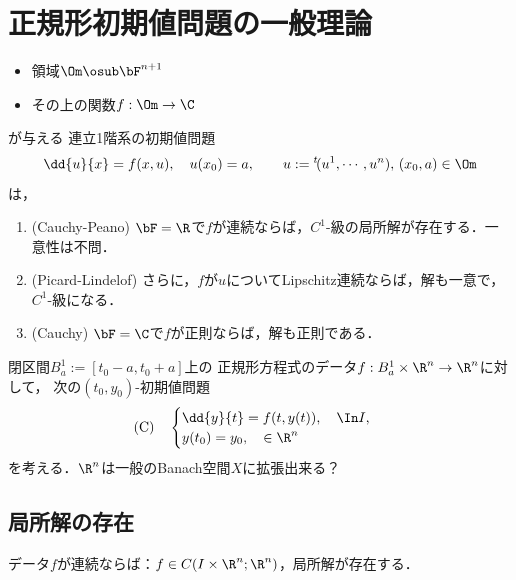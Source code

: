 \documentclass[uplatex,dvipdfmx]{jsreport}
\begin{document}
\section{正規形初期値問題の一般理論}

\begin{tcolorbox}[colframe=ForestGreen, colback=ForestGreen!10!white,breakable,colbacktitle=ForestGreen!40!white,coltitle=black,fonttitle=\bfseries\sffamily,
title=]
    \begin{remarks}\mbox{}
        \begin{itemize}
            \item 領域$\Om\osub\bF^{n+1}$
            \item その上の関数$f:\Om\to\C$
        \end{itemize}
        が与える
        連立1階系の初期値問題
        \[\dd{u}{x}=f(x,u),\quad u(x_0)=a,\qquad u:={}^t\!(u^1,\cdots,u^n),\,(x_0,a)\in\Om\]
        は，
        \begin{enumerate}
            \item (Cauchy-Peano) $\bF=\R$で$f$が連続ならば，$C^1$-級の局所解が存在する．一意性は不問．
            \item (Picard-Lindelof) さらに，$f$が$u$についてLipschitz連続ならば，解も一意で，$C^1$-級になる．
            \item (Cauchy) $\bF=\C$で$f$が正則ならば，解も正則である．
        \end{enumerate}
    \end{remarks}
\end{tcolorbox}

\begin{problem}
    閉区間$B^1_a:=[t_0-a,t_0+a]$上の
    正規形方程式のデータ$f:B^1_a\times\R^n\to\R^n$に対して，
    次の$(t_0,y_0)$-初期値問題
    \[\mathrm{(C)}\quad\begin{cases}
        \dd{y}{t}=f(t,y(t)),\quad\In I,\\
        y(t_0)=y_0,\quad\in\R^n
    \end{cases}\]
    を考える．$\R^n$は一般のBanach空間$X$に拡張出来る？
\end{problem}

\subsection{局所解の存在}

\begin{tcolorbox}[colframe=ForestGreen, colback=ForestGreen!10!white,breakable,colbacktitle=ForestGreen!40!white,coltitle=black,fonttitle=\bfseries\sffamily,
title=]
    データ$f$が連続ならば：$f\in C(I\times\R^n;\R^n)$，局所解が存在する．
\end{tcolorbox}
\end{document}
